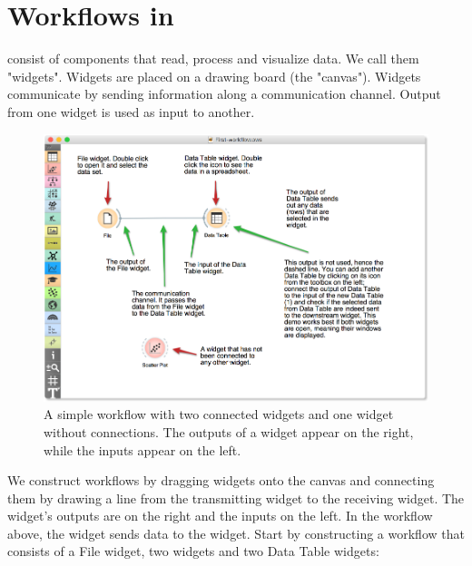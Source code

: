 \chapter{Workflows in \mutation}
\label{ch:workflows}

 consist of components that read, process and visualize data. We call them "widgets". Widgets are placed on a drawing board (the "canvas"). Widgets communicate by sending information along a communication channel. Output from one widget is used as input to another.

\begin{figure}[h]
  \includegraphics[width=\linewidth]{workflow-fig1.png}%
  \caption{A simple workflow with two connected widgets and one widget without connections. The outputs of a widget appear on the right, while the inputs appear on the left.}
  \label{fig:workflow-fig1}
\end{figure}

We construct workflows by dragging widgets onto the canvas and connecting them by drawing a line from the transmitting widget to the receiving widget. The widget's outputs are on the right and the inputs on the left. In the workflow above, the  widget sends data to the  widget.
\newpage
Start by constructing a workflow that consists of a File widget, two  widgets and two Data Table widgets:

